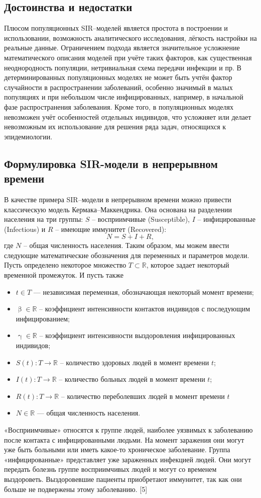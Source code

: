 \documentclass[a4paper, 14pt]{extreport}
\renewcommand{\beta}{\upbeta}
\renewcommand{\gamma}{\upgamma}
\begin{document}
	\subsection{Достоинства и недостатки}
	Плюсом популяционных SIR–моделей
	является простота в построении и использовании, возможность аналитического
	исследования, лёгкость настройки на реальные данные. Ограничением подхода
	является значительное усложнение математического описания моделей при
	учёте таких факторов, как существенная неоднородность популяции,
	нетривиальная схема передачи инфекции и пр. В детерминированных
	популяционных моделях не может быть учтён фактор случайности в
	распространении заболеваний, особенно значимый в малых популяциях и при
	небольшом числе инфицированных, например, в начальной фазе
	распространения заболевания. Кроме того, в популяционных моделях
	невозможен учёт особенностей отдельных индивидов, что усложняет или
	делает невозможным их использование для решения ряда задач, относящихся к
	эпидемиологии. 
	\subsection{Формулировка SIR-модели в непрерывном времени}
	В качестве примера SIR–модели в непрерывном времени можно привести
	классическую модель Кермака–Маккендрика. Она  основана на разделении населения на три группы: $S$ -- восприимчивые (Susceptible), $I$ -- инфицированные (Infectious) и $R$ -- имеющие иммунитет (Recovered): $$N = S + I + R,$$ где $N$ -- общая численность населения.
	Таким образом, мы можем ввести следующие математические обозначения для переменных и параметров модели. Пусть определено некоторое множество $T \subset \mathbb R$, которое задает некоторый временной промежуток. И пусть также
	\begin{itemize}
		\item $t \in T$ --- независимая переменная, обозначающая некоторый момент времени;
		\item $\beta\in \mathbb R$ -- коэффициент интенсивности контактов индивидов с
		последующим инфицированием;
		\item $\gamma\in \mathbb R$ -- коэффициент интенсивности выздоровления
		инфицированных индивидов;
		\item $S(t): T \to \mathbb R$ -- количество здоровых людей в момент времени $t$; 
		\item $I(t): T \to \mathbb R$ -- количество больных людей в момент времени $t$;
		\item $R(t): T \to \mathbb R$ -- количество переболевших людей в момент времени $t$
		\item $N \in \mathbb R$ --- общая численность населения.
	\end{itemize}
	«Восприимчивые» относятся к группе людей, наиболее уязвимых к заболеванию после контакта с инфицированными людьми. На момент заражения они могут уже быть больными или иметь какое-то хроническое заболевание. Группа «инфицированные» представляет уже зараженных инфекцией людей. Они могут передать болезнь группе восприимчивых людей и могут со временем выздороветь. Выздоровевшие пациенты приобретают иммунитет, так как они больше не подвержены этому заболеванию. [5]
	
\end{document}
